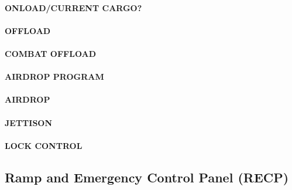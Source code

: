 \paragraph*{ONLOAD/CURRENT CARGO?}

\paragraph*{OFFLOAD}

\paragraph*{COMBAT OFFLOAD}

\paragraph*{AIRDROP PROGRAM}

\paragraph*{AIRDROP}

\paragraph*{JETTISON}

\paragraph*{LOCK CONTROL}

\subsection{Ramp and Emergency Control Panel (RECP)}
\label{sec:recp}


